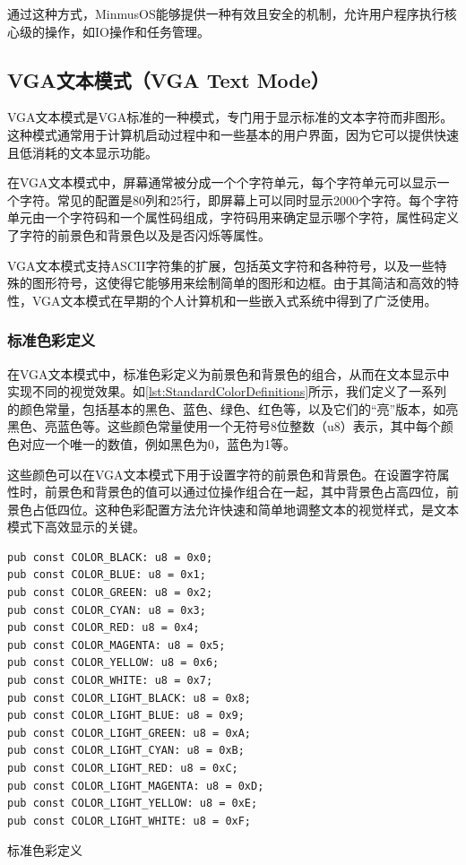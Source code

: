 通过这种方式，MinmusOS能够提供一种有效且安全的机制，允许用户程序执行核心级的操作，如IO操作和任务管理。

\subsection{VGA文本模式（VGA Text Mode）}

VGA文本模式是VGA标准的一种模式，专门用于显示标准的文本字符而非图形。这种模式通常用于计算机启动过程中和一些基本的用户界面，因为它可以提供快速且低消耗的文本显示功能。

在VGA文本模式中，屏幕通常被分成一个个字符单元，每个字符单元可以显示一个字符。常见的配置是80列和25行，即屏幕上可以同时显示2000个字符。每个字符单元由一个字符码和一个属性码组成，字符码用来确定显示哪个字符，属性码定义了字符的前景色和背景色以及是否闪烁等属性。

VGA文本模式支持ASCII字符集的扩展，包括英文字符和各种符号，以及一些特殊的图形符号，这使得它能够用来绘制简单的图形和边框。由于其简洁和高效的特性，VGA文本模式在早期的个人计算机和一些嵌入式系统中得到了广泛使用。

\subsubsection{标准色彩定义}

在VGA文本模式中，标准色彩定义为前景色和背景色的组合，从而在文本显示中实现不同的视觉效果。如\cref{lst:StandardColorDefinitions}所示，我们定义了一系列的颜色常量，包括基本的黑色、蓝色、绿色、红色等，以及它们的“亮”版本，如亮黑色、亮蓝色等。这些颜色常量使用一个无符号8位整数（u8）表示，其中每个颜色对应一个唯一的数值，例如黑色为0，蓝色为1等。

这些颜色可以在VGA文本模式下用于设置字符的前景色和背景色。在设置字符属性时，前景色和背景色的值可以通过位操作组合在一起，其中背景色占高四位，前景色占低四位。这种色彩配置方法允许快速和简单地调整文本的视觉样式，是文本模式下高效显示的关键。

\begin{listing}[htbp]
    \begin{verbatim}
pub const COLOR_BLACK: u8 = 0x0;
pub const COLOR_BLUE: u8 = 0x1;
pub const COLOR_GREEN: u8 = 0x2;
pub const COLOR_CYAN: u8 = 0x3;
pub const COLOR_RED: u8 = 0x4;
pub const COLOR_MAGENTA: u8 = 0x5;
pub const COLOR_YELLOW: u8 = 0x6;
pub const COLOR_WHITE: u8 = 0x7;
pub const COLOR_LIGHT_BLACK: u8 = 0x8;
pub const COLOR_LIGHT_BLUE: u8 = 0x9;
pub const COLOR_LIGHT_GREEN: u8 = 0xA;
pub const COLOR_LIGHT_CYAN: u8 = 0xB;
pub const COLOR_LIGHT_RED: u8 = 0xC;
pub const COLOR_LIGHT_MAGENTA: u8 = 0xD;
pub const COLOR_LIGHT_YELLOW: u8 = 0xE;
pub const COLOR_LIGHT_WHITE: u8 = 0xF;
    \end{verbatim}
    \caption{标准色彩定义}\label{lst:StandardColorDefinitions}
\end{listing}

